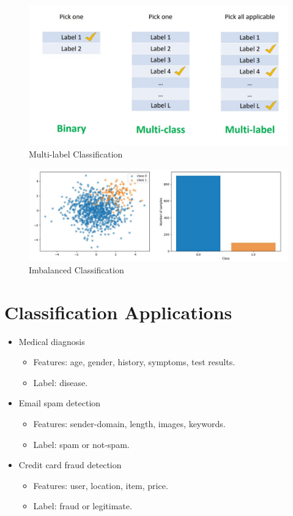 \documentclass[
	number={1},
	title={Machine Learning Fundamentals}
]{cs584notes}
\begin{document}
\begin{figure}[H]
	\centering
	\includegraphics[width=\textwidth]{figures/1/multi_label_classification}
	\caption{Multi-label Classification}
	\label{fig:multi-label-classification}
\end{figure}

\begin{figure}[H]
	\centering
	\includegraphics[width=\textwidth]{figures/1/imbalanced_classification}
	\caption{Imbalanced Classification}
	\label{fig:imbalanced-classification}
\end{figure}

\section{Classification Applications}\label{sec:classification-applications}
\begin{itemize}
	\item Medical diagnosis
	\begin{itemize}
		\item Features: age, gender, history, symptoms, test results.
		\item Label: disease.
	\end{itemize}
	\item Email spam detection
	\begin{itemize}
		\item Features: sender-domain, length, images, keywords.
		\item Label: spam or not-spam.
	\end{itemize}
	\item Credit card fraud detection
	\begin{itemize}
		\item Features: user, location, item, price.
		\item Label: fraud or legitimate.
	\end{itemize}
\end{itemize}
\end{document}
